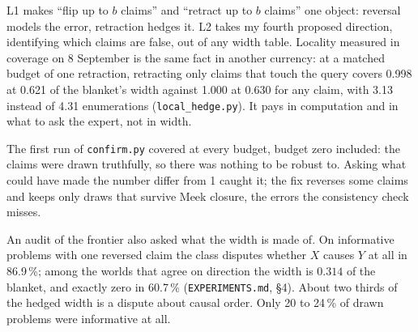 L1 makes ``flip up to $b$ claims'' and ``retract up to $b$ claims'' one object: reversal models the error,
retraction hedges it. L2 takes my fourth proposed direction, identifying which claims are false, out of any width
table. Locality measured in coverage on 8 September is the same fact in another currency: at a matched budget of
one retraction, retracting only claims that touch the query covers 0.998 at 0.621 of the blanket's width against 1.000
at 0.630 for any claim, with 3.13 instead of 4.31 enumerations (\texttt{local\_hedge.py}). It pays in computation and in what to ask the expert, not in width.

\begin{armadilha}
The first run of \texttt{confirm.py} covered at every budget, budget zero included: the claims were drawn
truthfully, so there was nothing to be robust to. Asking what could have made the number differ from 1 caught it;
the fix reverses some claims and keeps only draws that survive Meek closure, the errors the consistency check misses.
\end{armadilha}

An audit of the frontier also asked what the width is made of. On informative problems with one reversed claim the class disputes
whether $X$ causes $Y$ at all in 86.9\,\%; among the worlds that agree on direction the width is $0.314$ of the
blanket, and exactly zero in 60.7\,\% (\texttt{EXPERIMENTS.md}, \S4). About two thirds of the hedged width is a
dispute about causal order. Only 20 to 24\,\% of drawn problems were informative at all.



